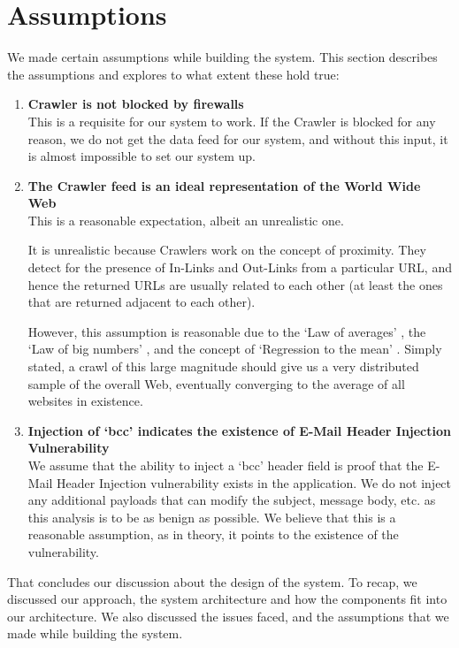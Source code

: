 \section{Assumptions}
We made certain assumptions while building the system. This section describes the assumptions and explores to what extent these hold true:
\begin{enumerate}
	\item \textbf{Crawler is not blocked by firewalls}\\
	This is a requisite for our system to work. If the Crawler is blocked for any reason, we do not get the data feed for our system, and without this input, it is almost impossible to set our system up.
	\item \textbf{The Crawler feed is an ideal representation of the World Wide Web} \\
	This is a reasonable expectation, albeit an unrealistic one.
	
	It is unrealistic because Crawlers work on the concept of proximity. They detect for the presence of In-Links and Out-Links from a particular URL, and hence the returned URLs are usually related to each other (at least the ones that are returned adjacent to each other).
	
	However, this assumption is reasonable due to the `Law of averages' \cite{wiki:Law_of_averages}, the `Law of big numbers' \cite{wiki:Law_of_large_numbers}, and the concept of `Regression to the mean' \cite{wiki:Regression_toward_the_mean}. Simply stated, a crawl of this large magnitude should give us a very distributed sample of the overall Web, eventually converging to the average of all websites in existence.
	
	\item \textbf{Injection of `bcc' indicates the existence of E-Mail Header Injection Vulnerability} \\
	We assume that the ability to inject a `bcc' header field is proof that the E-Mail Header Injection vulnerability exists in the application. We do not inject any additional payloads that can modify the subject, message body, etc. as this analysis is to be as benign as possible.
	We believe that this is a reasonable assumption, as in theory, it points to the existence of the vulnerability.
\end{enumerate}

That concludes our discussion about the design of the system. To recap, we discussed our approach, the system architecture and how the components fit into our architecture. We also discussed the issues faced, and the assumptions that we made while building the system. %